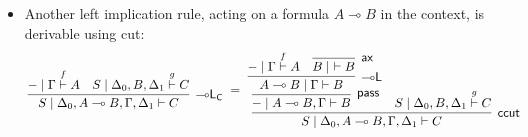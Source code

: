 \documentclass[submission,copyright,creativecommons]{eptcs}
\makeatletter
\newtheorem{remark}[theorem]{Remark}
\theoremstyle{definition}
\newcommand{\llangle}[1][]{\savebox{\@brx}{\(\m@th{#1\langle}\)}%
  \mathopen{\copy\@brx\kern-0.5\wd\@brx\usebox{\@brx}}}
\newcommand{\ldbc}{[\![}
\newcommand{\rdbc}{]\!]}
\newcommand{\lleft}{{\multimap}\mathsf{L}}
\newcommand{\pass}{\mathsf{pass}}
\newcommand{\ax}{\mathsf{ax}}
\newcommand{\ot}{\otimes}
\newcommand{\lolli}{\multimap}
\newcommand{\I}{\mathsf{I}}
\newcommand{\proofbox}[1]{\begin{tabular}{l} #1 \end{tabular}}
\makeatother
\begin{document}
\begin{itemize}
\item Another left implication rule, acting on a formula $A \lolli B$ in the context, is derivable using cut:
\begin{equation}\label{eq:lleft:gen}
    \!\!\!
  \proofbox{
    \infer[\lleft_{\mathsf{C}}]{S \mid \Delta_0, A \lolli B, \Gamma , \Delta_1 \vdash C}{
      - \mid \Gamma \stackrel{f}{\vdash} A
      &
      S \mid \Delta_0, B , \Delta_1 \stackrel{g}{\vdash} C
    }
  }
  {=}
  \proofbox{
    \infer[\mathsf{ccut}]{S \mid \Delta_0, A \lolli B, \Gamma , \Delta_1 \vdash C}{
      \infer[\pass]{- \mid A \lolli B, \Gamma \vdash B}{
        \infer[\lleft]{A \lolli B \mid \Gamma \vdash B}{
          - \mid \Gamma \stackrel{f}{\vdash} A
          &
          \infer[\ax]{B \mid ~ \vdash B}{}
        }
      }
      &
      S \mid \Delta_0, B , \Delta_1 \stackrel{g}{\vdash} C
    }
  }
\end{equation}
\end{itemize}

\end{document}
